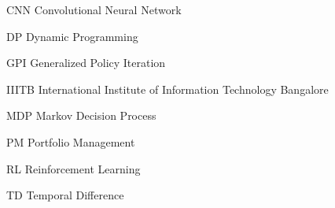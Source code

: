 \begin{abbreviations}
\item[CNN] Convolutional Neural Network
\item[DP]  Dynamic Programming 
\item[GPI] Generalized Policy Iteration
\item[IIITB] International Institute of Information Technology Bangalore
\item[MDP] Markov Decision Process
\item[PM] Portfolio Management
\item[RL] Reinforcement Learning
\item[TD] Temporal Difference
\end{abbreviations}
